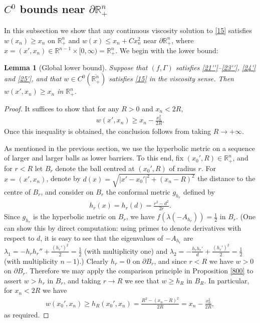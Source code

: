 \documentclass[12pt]{article}
\numberwithin{equation}{section}
\theoremstyle{plain}
\newtheorem{lem}[thm]{Lemma}
\theoremstyle{definition}
\begin{document}
\subsection{$C^0$ bounds near $\partial\mathbb{R}^n_+$}\label{c0}


In this subsection we show that any continuous viscosity solution to \eqref{15} satisfies $w(x_n) \geq x_n$ on $\mathbb{R}_+^n$ and $w(x) \leq x_n + Cx_n^2$ near $\partial\mathbb{R}_+^n$, where $x = (x',x_n)\in\mathbb{R}^{n-1}\times[0,\infty) = \mathbb{R}_+^n$. We begin with the lower bound:

\begin{lem}[Global lower bound]\label{l1}
	Suppose that $(f,\Gamma)$ satisfies \eqref{21''}--\eqref{23''}, \eqref{24'} and \eqref{25'}, and that $w\in C^0(\overline{\mathbb{R}_+^n})$ satisfies \eqref{15} in the viscosity sense. Then $w(x',x_n) \geq x_n$ in $\mathbb{R}_+^n$. 
\end{lem}
\begin{proof}
	It suffices to show that for any $R>0$ and $x_n<2R$,
	\begin{align*}
	w(x',x_n) \geq x_n - \frac{x_n^2}{2R}. 
	\end{align*}
	Once this inequality is obtained, the conclusion follows from taking $R\rightarrow+\infty$. \medskip 
	
	
	 As mentioned in the previous section, we use the hyperbolic metric on a sequence of larger and larger balls as lower barriers. To this end, fix $(x_0', R)\in\mathbb{R}_+^n$, and for $r < R$ let $B_r$ denote the ball centred at $(x_0', R)$ of radius $r$. For $x = (x', x_n)$, denote by $d(x) = \sqrt{|x'-x_0'|^2 + (x_n - R)^2}$ the distance to the centre of $B_r$, and consider on $B_r$ the conformal metric $g_{h_r}$ defined by
	\begin{align*}
	h_r (x) = h_r (d) = \frac{r^2- d^2}{2r}. 
	\end{align*}
	Since  $g_{h_r}$ is the hyperbolic metric on $B_r$, we have $f(\lambda(-A_{h_r}))  = \frac{1}{2}$ in $B_r$. (One can show this by direct computation: using primes to denote derivatives with respect to $d$, it is easy to see that the eigenvalues of $-A_{h_r}$ are $\lambda_1 = -h_r h_r'' + \frac{(h_r')^2}{2} = \frac{1}{2}$ (with multiplicity one) and $\lambda_2 = -\frac{h_r h_r'}{d} + \frac{(h_r')^2}{2} = \frac{1}{2}$ (with multiplicity $n-1$).) Clearly $h_r = 0$ on $\partial B_r$, and since $r<R$ we have $w>0$ on $\partial B_r$. Therefore we may apply the comparison principle in Proposition \ref{800} to assert $w>h_r$ in $B_r$, and taking $r\rightarrow R$ we see that $w \geq h_R$ in $B_R$. In particular, for $x_n < 2R$ we have
	\begin{align*}
	w(x_0', x_n) \geq h_R(x_0', x_n) = \frac{R^2 - (x_n - R)^2}{2R} = x_n - \frac{x_n^2}{2R},
	\end{align*}
	as required. 
\end{proof}
\end{document}
